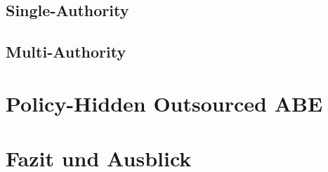 \documentclass{hsflensburg}
\begin{document}
	\subsection{Single-Authority}
	\subsection{Multi-Authority}

	\section{Policy-Hidden Outsourced ABE}
	\section{Fazit und Ausblick}

	\newpage
	
	
\end{document}
